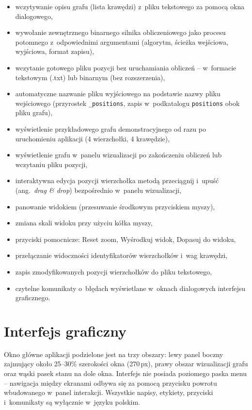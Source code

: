 \documentclass[12pt,a4paper]{article}
\begin{document}
\begin{itemize}
    \item wczytywanie opisu grafu (lista krawędzi) z~pliku tekstowego za pomocą okna dialogowego,
    \item wywołanie zewnętrznego binarnego silnika obliczeniowego jako procesu potomnego z~odpowiednimi argumentami (algorytm, ścieżka wejściowa, wyjściowa, format zapisu),
    \item wczytanie gotowego pliku pozycji bez uruchamiania obliczeń -- w~formacie tekstowym (.txt) lub binarnym (bez rozszerzenia),
    \item automatyczne nazwanie pliku wyjściowego na podstawie nazwy pliku wejściowego (przyrostek \texttt{\_positions}, zapis w~podkatalogu \texttt{positions} obok pliku grafu),
    \item wyświetlenie przykładowego grafu demonstracyjnego od razu po uruchomieniu aplikacji (4 wierzchołki, 4 krawędzie),
    \item wyświetlenie grafu w~panelu wizualizacji po zakończeniu obliczeń lub wczytaniu pliku pozycji,
    \item interaktywna edycja pozycji wierzchołka metodą przeciągnij i~upuść (ang.~\textit{drag \& drop}) bezpośrednio w~panelu wizualizacji,
    \item panowanie widokiem (przesuwanie środkowym przyciskiem myszy),
    \item zmiana skali widoku przy użyciu kółka myszy,
    \item przyciski pomocnicze: Reset zoom, Wyśrodkuj widok, Dopasuj do widoku,
    \item przełączanie widoczności identyfikatorów wierzchołków i~wag krawędzi,
    \item zapis zmodyfikowanych pozycji wierzchołków do pliku tekstowego,
    \item czytelne komunikaty o~błędach wyświetlane w~oknach dialogowych interfejsu graficznego.
\end{itemize}

\section{Interfejs graficzny}

Okno główne aplikacji podzielone jest na trzy obszary: lewy panel boczny zajmujący około 25--30\% szerokości okna (270\,px), prawy obszar wizualizacji grafu oraz wąski pasek stanu na dole okna. Interfejs nie posiada poziomego paska menu -- nawigacja między ekranami odbywa się za pomocą przycisku powrotu wbudowanego w~panel interakcji. Wszystkie napisy, etykiety, przyciski i~komunikaty są wyłącznie w~języku polskim.
\end{document}
